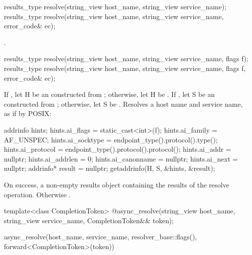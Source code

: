 \begin{itemdecl}
results_type resolve(string_view host_name, string_view service_name);
results_type resolve(string_view host_name, string_view service_name,
                     error_code& ec);
\end{itemdecl}

\begin{itemdescr}
\pnum
\returns {}.
\end{itemdescr}

\begin{itemdecl}
results_type resolve(string_view host_name, string_view service_name,
                     flags f);
results_type resolve(string_view host_name, string_view service_name,
                     flags f, error_code& ec);
\end{itemdecl}

\begin{itemdescr}
\pnum
\effects If , let H be an \ntbs constructed from ; otherwise, let H be . If , let S be an \ntbs constructed from ; otherwise, let S be . Resolves a host name and service name, as if by POSIX:
\begin{codeblock}
addrinfo hints;
hints.ai_flags = static_cast<int>(f);
hints.ai_family = AF_UNSPEC;
hints.ai_socktype = endpoint_type().protocol().type();
hints.ai_protocol = endpoint_type().protocol().protocol();
hints.ai_addr = nullptr;
hints.ai_addrlen = 0;
hints.ai_canonname = nullptr;
hints.ai_next = nullptr;
addrinfo* result = nullptr;
getaddrinfo(H, S, &hints, &result);
\end{codeblock}


\pnum
\returns On success, a non-empty results object containing the results of the resolve operation. Otherwise .
\end{itemdescr}

\begin{itemdecl}
template<class CompletionToken>
  @\DEDUCED@ async_resolve(string_view host_name, string_view service_name,
                        CompletionToken&& token);
\end{itemdecl}

\begin{itemdescr}
\pnum
\returns
\begin{codeblock}
async_resolve(host_name, service_name, resolver_base::flags(),
              forward<CompletionToken>(token))
\end{codeblock}
\end{itemdescr}

